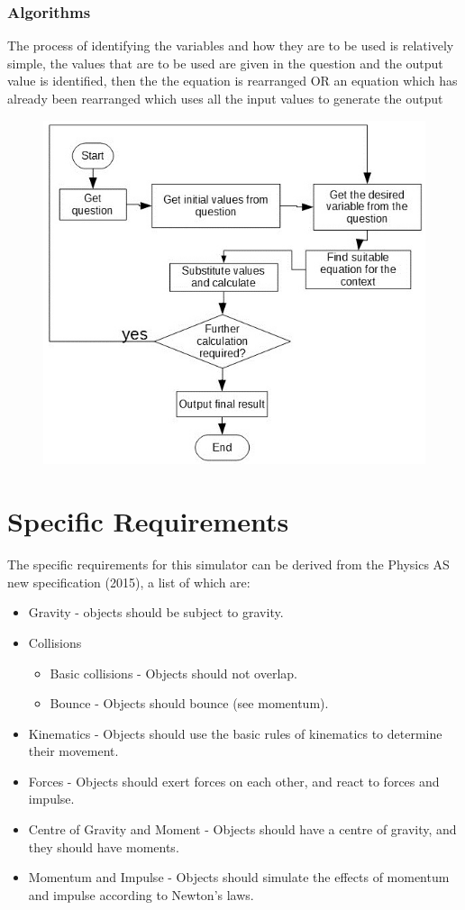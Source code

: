 \subsubsection{Algorithms}
	The process of identifying the variables and how they are to be used is relatively simple, the values that are to be used are given in the question and the output value is identified, then the the equation is rearranged OR an equation which has already been rearranged which uses all the input values to generate the output 
	\begin{figure}[H]
		\includegraphics[width=\textwidth]{./Analysis/algorithms_current_system.JPG}
	\end{figure}


\section{Specific Requirements}
The specific requirements for this simulator can be derived from the Physics AS new specification (2015), a list of which are:
\begin{itemize}
	\item Gravity  - objects should be subject to gravity.
	\item Collisions
	\begin{itemize}
		\item Basic collisions - Objects should not overlap.
		\item Bounce - Objects should bounce (see momentum).
	\end{itemize}
	\item Kinematics - Objects should use the basic rules of kinematics to determine their movement.
	\item Forces - Objects should exert forces on each other, and react to forces and impulse.
	\item Centre of Gravity and Moment - Objects should have a centre of gravity, and they should have moments.
	\item Momentum and Impulse - Objects should simulate the effects of momentum and impulse according to Newton's laws.
\end{itemize}

